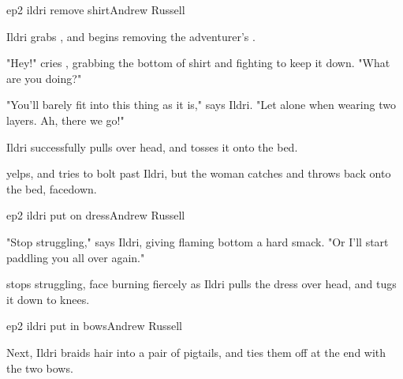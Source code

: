 \documentclass{book}
\begin{document}
\begin{childnode}{ep2 ildri remove shirt}{Andrew Russell}

    Ildri grabs \name{}, and begins removing the adventurer's \shirt{}.

    "Hey!" cries \name{}, grabbing the bottom  of \hisher{} shirt and fighting to keep it down. "What are you doing?"

    "You'll barely fit into this thing as it is," says Ildri. "Let alone when wearing two layers. Ah, there we go!"

    Ildri successfully pulls \names{} \shirt{} over \hisher{} head, and tosses it onto the bed.

    \name{} yelps, and tries to bolt past Ildri, but the woman catches \himher{} and throws \himher{} back onto the bed, facedown.



\end{childnode}

\begin{childnode}{ep2 ildri put on dress}{Andrew Russell}

    "Stop struggling," says Ildri, giving \names{} flaming bottom a hard smack. "Or I'll start paddling you all over again." 

    \name{} stops struggling, \hisher{} face burning fiercely as Ildri pulls the dress over \hisher{} head, and tugs it down to \hisher{} knees.



\end{childnode}

\begin{childnode}{ep2 ildri put in bows}{Andrew Russell}

    Next, Ildri braids \names{} hair into a pair of pigtails, and ties them off at the end with the two bows.


\end{childnode}
\end{document}

